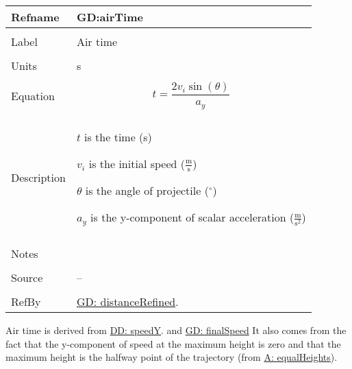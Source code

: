 \documentclass[12pt]{article}
\begin{document}
\noindent \begin{minipage}{\textwidth}
\begin{tabular}{p{} p{}}
\toprule \textbf{Refname} & \textbf{GD:airTime}
\label{GD:airTime}
\\ \midrule \\
Label & Air time
\\ \midrule \\
Units & s
\\ \midrule \\
Equation & \begin{displaymath}
           t=\frac{2 {v_{i}} \sin\left(θ\right)}{{a_{y}}}
           \end{displaymath}
\\ \midrule \\
Description & \begin{symbDescription}
              \item{$t$ is the time (s)}
              \item{${v_{i}}$ is the initial speed ($\frac{\text{m}}{\text{s}}$)}
              \item{$θ$ is the angle of projectile (${}^{\circ}$)}
              \item{${a_{y}}$ is the y-component of scalar acceleration ($\frac{\text{m}}{\text{s}^{2}}$)}
              \end{symbDescription}
\\ \midrule \\
Notes & 
\\ \midrule \\
Source & --
\\ \midrule \\
RefBy & \hyperref[GD:distanceRefined]{GD: distanceRefined}.
\\ \bottomrule \end{tabular}
\end{minipage}
Air time is derived from \hyperref[DD:speedY]{DD: speedY}. and \hyperref[GD:finalSpeed]{GD: finalSpeed} It also comes from the fact that the y-component of speed at the maximum height is zero and that the maximum height is the halfway point of the trajectory (from \hyperref[equalHeights]{A: equalHeights}).
\par~
\end{document}
